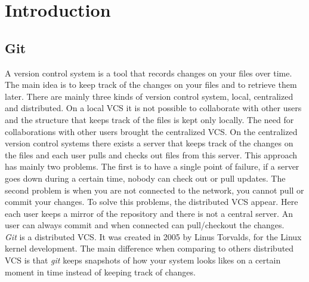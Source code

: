 \section{Introduction}
\subsection{Git}
A version control system is a tool that records changes on your
files over time. The main idea is to keep track of the changes on your
files and to retrieve them later. There are mainly three kinds of 
version control system, local, centralized and distributed. On
a local VCS it is not possible to collaborate with other users and
the structure that keeps track of the files is kept only locally. The
need for collaborations with other users brought the centralized VCS.
On the centralized version control systems there exists a server that keeps
track of the changes on the files and each user pulls and checks out files
from this server. This approach has mainly two problems. The
first is to have a single point of failure, if a server goes down
during a certain time, nobody can check out or pull updates. The
second problem is when you are not connected to the network, you
cannot pull or commit your changes. To solve this problems, the
distributed VCS appear. Here each user keeps a mirror of the
repository and there is not a central server. An user can always commit
and when connected can pull/checkout the changes.\\

\emph{Git} is a distributed VCS. It was created in 2005 by Linus Torvalds,
for the Linux kernel development. The main difference when comparing to
others distributed VCS is that \emph{git} keeps snapshots of how your system
looks likes on a certain moment in time instead of keeping track of
changes.\par
